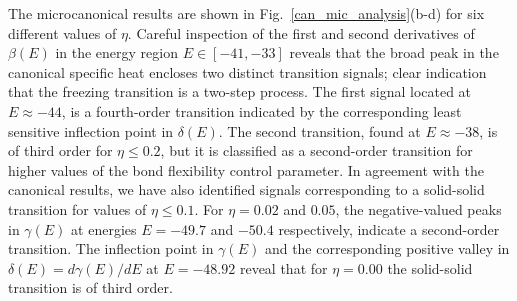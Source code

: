 \documentclass[12pt]{report}
\begin{document}
The microcanonical results are shown in Fig.~\ref{can_mic_analysis}(b-d)
for six different values of $\eta$. Careful inspection of the first and
second derivatives of $\beta(E)$ in the energy region $E\in[-41,-33]$
reveals that the broad peak in the canonical specific heat encloses two
distinct transition signals; clear indication that the freezing
transition is a two-step process. The first signal located at $E\approx
-44$, is a fourth-order transition indicated by the corresponding least
sensitive inflection point in
$\delta(E)$. The second transition, found at $E\approx -38$, is of
third order for $\eta \leq 0.2$, but it is classified as a second-order
transition for higher values of the bond flexibility control parameter.
In agreement with the canonical results, we have also identified signals
corresponding to a solid-solid transition for values of $\eta \leq 0.1$.
For $\eta=0.02$ and $0.05$, the negative-valued peaks in $\gamma(E)$ at
energies $E=-49.7$ and $-50.4$ respectively, indicate a second-order
transition. The inflection point in $\gamma(E)$ and the corresponding
positive valley in $\delta(E)=d \gamma(E)/d E$ at $E=-48.92$ reveal that
for $\eta = 0.00$ the solid-solid transition is of third order. 
\end{document}
